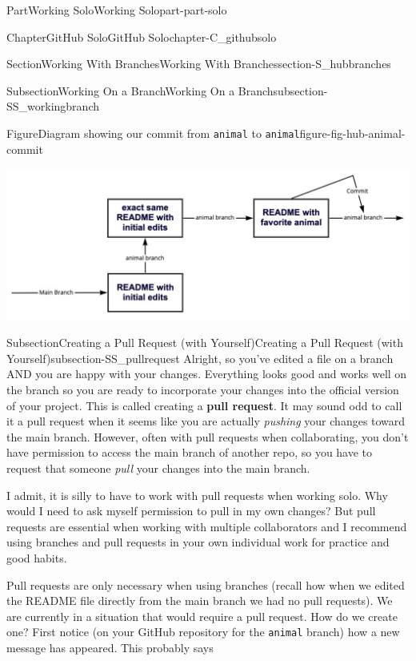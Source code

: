 \documentclass[oneside,10pt,]{book}
\newcommand{\mono}[1]{\texttt{#1}}
\newcommand{\terminology}[1]{\textbf{#1}}
\begin{document}
\begin{partptx}{Part}{Working Solo}{}{Working Solo}{}{}{part-part-solo}
\begin{chapterptx}{Chapter}{GitHub Solo}{}{GitHub Solo}{}{}{chapter-C_githubsolo}
\begin{sectionptx}{Section}{Working With Branches}{}{Working With Branches}{}{}{section-S_hubbranches}
\begin{subsectionptx}{Subsection}{Working On a Branch}{}{Working On a Branch}{}{}{subsection-SS_workingbranch}
\begin{figureptx}{Figure}{Diagram showing our commit from \mono{animal} to \mono{animal}}{figure-fig-hub-animal-commit}{}
\begin{image}{0.05}{0.9}{0.05}{}
\includegraphics[width=\linewidth]{external/hub_animal_commit.pdf}
\end{image}%
\tcblower
\end{figureptx}%
\end{subsectionptx}
%
%
\typeout{************************************************}
\typeout{************************************************}
%
\begin{subsectionptx}{Subsection}{Creating a Pull Request (with Yourself)}{}{Creating a Pull Request (with Yourself)}{}{}{subsection-SS_pullrequest}
%
%
%
%
Alright, so you've edited a file on a branch AND you are happy with your changes. Everything looks good and works well on the branch so you are ready to incorporate your changes into the official version of your project. This is called creating a \terminology{pull request}. It may sound odd to call it a pull request when it seems like you are actually \emph{pushing} your changes toward the main branch. However, often with pull requests when collaborating, you don't have permission to access the main branch of another repo, so you have to request that someone \emph{pull} your changes into the main branch.%
\par
I admit, it is silly to have to work with pull requests when working solo. Why would I need to ask myself permission to pull in my own changes? But pull requests are essential when working with multiple collaborators and I recommend using branches and pull requests in your own individual work for practice and good habits.%
\par
{} Pull requests are only necessary when using branches (recall how when we edited the README file directly from the main branch we had no pull requests). We are currently in a situation that would require a pull request. How do we create one? First notice (on your GitHub repository for the \mono{animal} branch) how a new message has appeared. This probably says%

\end{subsectionptx}
\end{sectionptx}
\end{chapterptx}
\end{partptx}
\end{document}
